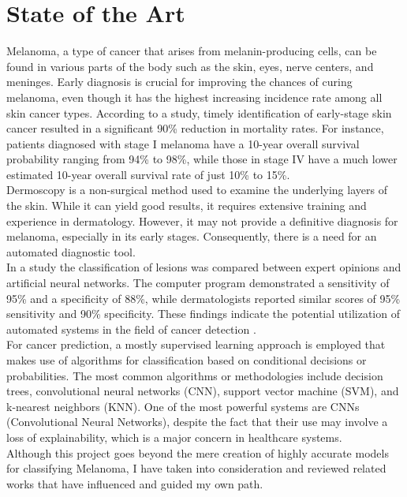 \chapter{State of the Art}
\label{cap:estat}

Melanoma, a type of cancer that arises from melanin-producing cells, can be found in various parts of the body such as the skin, eyes, nerve centers, and meninges. Early diagnosis is crucial for improving the chances of curing melanoma, even though it has the highest increasing incidence rate among all skin cancer types. According to a study, timely identification of early-stage skin cancer resulted in a significant 90\% reduction in mortality rates. For instance, patients diagnosed with stage I melanoma have a 10-year overall survival probability ranging from 94\% to 98\%, while those in stage IV have a much lower estimated 10-year overall survival rate of just 10\% to 15\%. \\

Dermoscopy is a non-surgical method used to examine the underlying layers of the skin. While it can yield good results, it requires extensive training and experience in dermatology. However, it may not provide a definitive diagnosis for melanoma, especially in its early stages. Consequently, there is a need for an automated diagnostic tool. \\

In a study the classification of lesions was compared between expert opinions and artificial neural networks. The computer program demonstrated a sensitivity of 95\% and a specificity of 88\%, while dermatologists reported similar scores of 95\% sensitivity and 90\% specificity. These findings indicate the potential utilization of automated systems in the field of cancer detection \cite{EpidemiologySkinCancer}. \\

For cancer prediction, a mostly supervised learning approach is employed that makes use of algorithms for classification based on conditional decisions or probabilities. The most common algorithms or methodologies include decision trees, convolutional neural networks (CNN), support vector machine (SVM), and k-nearest neighbors (KNN). One of the most powerful systems are CNNs (Convolutional Neural Networks), despite the fact that their use may involve a loss of explainability, which is a major concern in healthcare systems. \\

Although this project goes beyond the mere creation of highly accurate models for classifying Melanoma, I have taken into consideration and reviewed related works that have influenced and guided my own path.

